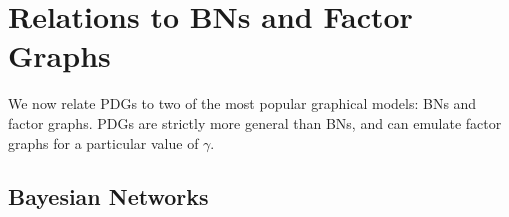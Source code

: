 \documentclass[letterpaper]{article} %
\theoremstyle{plain}
\theoremstyle{definition}
\theoremstyle{remark}
\begin{document}
\section{Relations to BNs and Factor Graphs}\label{sec:other-graphical-models} 
We now relate PDGs to two of the most popular graphical models: BNs and factor
graphs. PDGs are strictly more general than BNs, and can emulate factor graphs
for a particular value of $\gamma$. 
\begin{vfull}
\subsection{Bayesian Networks} 
\end{vfull}
\label{sec:bn-convert}
\end{document}
